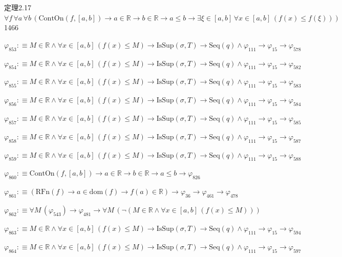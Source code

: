 \begin{fullproof}{定理2.17}{$\forall f\,\forall a\,\forall b\,(\mathrm{ContOn}(f,[a,b]) \to a \in \mathbb{R} \to b \in \mathbb{R} \to a \leq b \to \exists \xi \in [a,b]\,\forall x \in [a,b]\,(f(x) \leq f(\xi)))$}{1466}
\begin{abbrevlist}
\item $\varphi_{853} :\equiv M \in \mathbb{R} \land \forall x \in [a,b]\,(f(x) \leq M) \to \mathrm{IsSup}(\sigma,T) \to \mathrm{Seq}(q) \land \varphi_{111} \to \varphi_{15} \to \varphi_{578}$
\item $\varphi_{854} :\equiv M \in \mathbb{R} \land \forall x \in [a,b]\,(f(x) \leq M) \to \mathrm{IsSup}(\sigma,T) \to \mathrm{Seq}(q) \land \varphi_{111} \to \varphi_{15} \to \varphi_{582}$
\item $\varphi_{855} :\equiv M \in \mathbb{R} \land \forall x \in [a,b]\,(f(x) \leq M) \to \mathrm{IsSup}(\sigma,T) \to \mathrm{Seq}(q) \land \varphi_{111} \to \varphi_{15} \to \varphi_{583}$
\item $\varphi_{856} :\equiv M \in \mathbb{R} \land \forall x \in [a,b]\,(f(x) \leq M) \to \mathrm{IsSup}(\sigma,T) \to \mathrm{Seq}(q) \land \varphi_{111} \to \varphi_{15} \to \varphi_{584}$
\item $\varphi_{857} :\equiv M \in \mathbb{R} \land \forall x \in [a,b]\,(f(x) \leq M) \to \mathrm{IsSup}(\sigma,T) \to \mathrm{Seq}(q) \land \varphi_{111} \to \varphi_{15} \to \varphi_{585}$
\item $\varphi_{858} :\equiv M \in \mathbb{R} \land \forall x \in [a,b]\,(f(x) \leq M) \to \mathrm{IsSup}(\sigma,T) \to \mathrm{Seq}(q) \land \varphi_{111} \to \varphi_{15} \to \varphi_{587}$
\item $\varphi_{859} :\equiv M \in \mathbb{R} \land \forall x \in [a,b]\,(f(x) \leq M) \to \mathrm{IsSup}(\sigma,T) \to \mathrm{Seq}(q) \land \varphi_{111} \to \varphi_{15} \to \varphi_{588}$
\item $\varphi_{860} :\equiv \mathrm{ContOn}(f,[a,b]) \to a \in \mathbb{R} \to b \in \mathbb{R} \to a \leq b \to \varphi_{826}$
\item $\varphi_{861} :\equiv (\mathrm{RFn}(f) \to a \in \mathrm{dom}(f) \to f(a) \in \mathbb{R}) \to \varphi_{36} \to \varphi_{461} \to \varphi_{478}$
\item $\varphi_{862} :\equiv \forall M\,(\varphi_{543}) \to \varphi_{481} \to \forall M\,(\neg (M \in \mathbb{R} \land \forall x \in [a,b]\,(f(x) \leq M)))$
\item $\varphi_{863} :\equiv M \in \mathbb{R} \land \forall x \in [a,b]\,(f(x) \leq M) \to \mathrm{IsSup}(\sigma,T) \to \mathrm{Seq}(q) \land \varphi_{111} \to \varphi_{15} \to \varphi_{594}$
\item $\varphi_{864} :\equiv M \in \mathbb{R} \land \forall x \in [a,b]\,(f(x) \leq M) \to \mathrm{IsSup}(\sigma,T) \to \mathrm{Seq}(q) \land \varphi_{111} \to \varphi_{15} \to \varphi_{597}$

\end{abbrevlist}
\end{fullproof}
